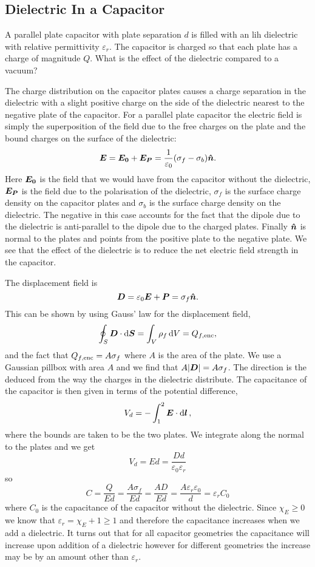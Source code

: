     \subsection{Dielectric In a Capacitor}
    A parallel plate capacitor with plate separation \(d\) is filled with an \gls{lih} dielectric with relative permittivity \(\varepsilon_r\).
    The capacitor is charged so that each plate has a charge of magnitude \(Q\).
    What is the effect of the dielectric compared to a vacuum?
    
    The charge distribution on the capacitor plates causes a charge separation in the dielectric with a slight positive charge on the side of the dielectric nearest to the negative plate of the capacitor.
    For a parallel plate capacitor the electric field is simply the superposition of the field due to the free charges on the plate and the bound charges on the surface of the dielectric:
    \[\bm{E} = \bm{E_0} + \bm{E_P} = \frac{1}{\varepsilon_0}(\sigma_f - \sigma_b)\bm{\hat{n}}.\]
    Here \(\bm{E_0}\) is the field that we would have from the capacitor without the dielectric, \(\bm{E_P}\) is the field due to the polarisation of the dielectric, \(\sigma_f\) is the surface charge density on the capacitor plates and \(\sigma_b\) is the surface charge density on the dielectric.
    The negative in this case accounts for the fact that the dipole due to the dielectric is anti-parallel to the dipole due to the charged plates.
    Finally \(\bm{\hat{n}}\) is normal to the plates and points from the positive plate to the negative plate.
    We see that the effect of the dielectric is to reduce the net electric field strength in the capacitor.
    
    The displacement field is
    \[\bm{D} = \varepsilon_0\bm{E} + \bm{P} = \sigma_f\bm{\hat{n}}.\]
    This can be shown by using Gauss' law for the displacement field,
    \[\oint_S \bm{D}\cdot\dd{\bm{S}} = \int_V \rho_f \dd{V} = Q_{f,{\mathrm{enc}}},\]
    and the fact that \(Q_{f,{\mathrm{enc}}} = A\sigma_f\) where \(A\) is the area of the plate.
    We use a Gaussian pillbox with area \(A\) and we find that \(A\abs{\bm{D}} = A\sigma_f\).
    The direction is the deduced from the way the charges in the dielectric distribute.
    The capacitance of the capacitor is then given in terms of the potential difference, 
    \[V_d = -\int_{1}^{2} \bm{E}\cdot\dd{\bm{l}},\]
    where the bounds are taken to be the two plates.
    We integrate along the normal to the plates and we get
    \[V_d = Ed = \frac{Dd}{\varepsilon_0\varepsilon_r}\]
    so
    \[C = \frac{Q}{Ed} = \frac{A\sigma_f}{Ed} = \frac{AD}{Ed} = \frac{A\varepsilon_r\varepsilon_0}{d} = \varepsilon_rC_0\]
    where \(C_0\) is the capacitance of the capacitor without the dielectric.
    Since \(\chi_E \ge 0\) we know that \(\varepsilon_r = \chi_E + 1 \ge 1\) and therefore the capacitance increases when we add a dielectric.
    It turns out that for all capacitor geometries the capacitance will increase upon addition of a dielectric however for different geometries the increase may be by an amount other than \(\varepsilon_r\).
    

